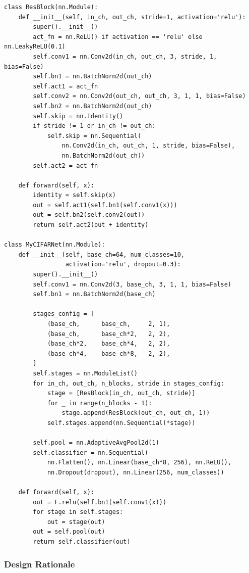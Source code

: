 \documentclass[11pt,a4paper]{article}
\begin{document}
\begin{lstlisting}[caption={ResidualBlock and MyCIFARNet implementation}, label={lst:net}]
class ResBlock(nn.Module):
    def __init__(self, in_ch, out_ch, stride=1, activation='relu'):
        super().__init__()
        act_fn = nn.ReLU() if activation == 'relu' else nn.LeakyReLU(0.1)
        self.conv1 = nn.Conv2d(in_ch, out_ch, 3, stride, 1, bias=False)
        self.bn1 = nn.BatchNorm2d(out_ch)
        self.act1 = act_fn
        self.conv2 = nn.Conv2d(out_ch, out_ch, 3, 1, 1, bias=False)
        self.bn2 = nn.BatchNorm2d(out_ch)
        self.skip = nn.Identity()
        if stride != 1 or in_ch != out_ch:
            self.skip = nn.Sequential(
                nn.Conv2d(in_ch, out_ch, 1, stride, bias=False),
                nn.BatchNorm2d(out_ch))
        self.act2 = act_fn

    def forward(self, x):
        identity = self.skip(x)
        out = self.act1(self.bn1(self.conv1(x)))
        out = self.bn2(self.conv2(out))
        return self.act2(out + identity)

class MyCIFARNet(nn.Module):
    def __init__(self, base_ch=64, num_classes=10,
                 activation='relu', dropout=0.3):
        super().__init__()
        self.conv1 = nn.Conv2d(3, base_ch, 3, 1, 1, bias=False)
        self.bn1 = nn.BatchNorm2d(base_ch)

        stages_config = [
            (base_ch,      base_ch,     2, 1),
            (base_ch,      base_ch*2,   2, 2),
            (base_ch*2,    base_ch*4,   2, 2),
            (base_ch*4,    base_ch*8,   2, 2),
        ]
        self.stages = nn.ModuleList()
        for in_ch, out_ch, n_blocks, stride in stages_config:
            stage = [ResBlock(in_ch, out_ch, stride)]
            for _ in range(n_blocks - 1):
                stage.append(ResBlock(out_ch, out_ch, 1))
            self.stages.append(nn.Sequential(*stage))

        self.pool = nn.AdaptiveAvgPool2d(1)
        self.classifier = nn.Sequential(
            nn.Flatten(), nn.Linear(base_ch*8, 256), nn.ReLU(),
            nn.Dropout(dropout), nn.Linear(256, num_classes))

    def forward(self, x):
        out = F.relu(self.bn1(self.conv1(x)))
        for stage in self.stages:
            out = stage(out)
        out = self.pool(out)
        return self.classifier(out)
\end{lstlisting}

\subsubsection{Design Rationale}
\end{document}
